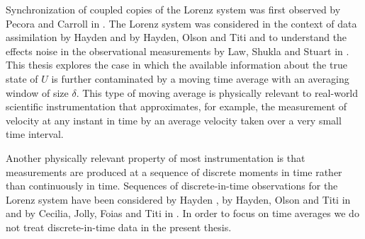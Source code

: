 \documentclass[master,tocprelim,12pt]{unrthesis}
\theoremstyle{definition}
\numberwithin{equation}{chapter}
\begin{document}
\begin{manuscript}
Synchronization of coupled copies of the Lorenz system
was first observed by Pecora and Carroll in \cite{Pecora90}.
The Lorenz system was considered in the context of data assimilation 
by Hayden \cite{HaydenThesis} and by Hayden, Olson and Titi 
\cite{Hayden11} and to understand the effects noise
in the observational measurements by Law, Shukla and Stuart 
in \cite{Stuart14}.
This thesis explores the case in which the
available information about the true state of $U$ is 
further contaminated
by a moving time average with an averaging window 
of size $\delta$.
This type of moving average is physically relevant to 
real-world scientific instrumentation that approximates,
for example, the measurement of velocity at any instant
in time by
an average velocity taken over a very small time interval.

Another physically relevant property of most instrumentation is 
that measurements are produced at a sequence of discrete moments 
in time rather than continuously in time.
Sequences of discrete-in-time observations for the Lorenz system
have been considered by Hayden \cite{HaydenThesis},
by Hayden, Olson and Titi in \cite{Hayden11} and 
by Cecilia, Jolly, Foias and Titi in \cite{Cecilia}.
In order to focus on time averages we do not treat
discrete-in-time data in the present thesis.


\end{manuscript}
\end{document}
